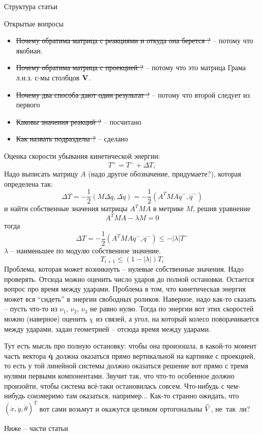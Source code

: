 



{\huge Структура статьи}


\vspace{20pt}

{\huge Открытые вопросы}
\begin{itemize}
    \item \sout{Почему обратима матрица с реакциями и откуда она берется ?} -- потому что якобиан.
    \item \sout{Почему обратима матрица с проекцией ?} -- потому что это матрица Грама л.н.з. с-мы столбцов $\mathbf{V}$.
    \item \sout{Почему два способа дают один результат ?} -- потому что второй следует из первого
    \item \sout{Каковы значения реакций ?} -- посчитано
    \item \sout{Как назвать подразделы ?} -- сделано
\end{itemize}

Оценка скорости убывания кинетической энергии:
$$
T^+ = T^- + \Delta T,
$$
Надо выписать матрицу $A$ (надо другое обозначение, придумаете?), которая определена так:
$$
\Delta T = -\frac12(M\Delta\dot{q},\Delta\dot{q}) = -\frac12(A^T M A\dot{q}^-, \dot{q}^{-})
$$
и найти собственные значения матрицы $A^T M A$ в метрике $M$, решив уравнение
$$
A^T M A - \lambda M = 0
$$
тогда 
$$
\Delta T = -\frac12(A^T M A\dot{q}^-, \dot{q}^{-}) \leq -|\lambda| T^{-}
$$
$\lambda$ -- наименьшее по модулю собственное значение.
$$
T_{i+1}\leq (1-|\lambda|) T_{i}
$$
Проблема, которая может возникнуть -- нулевые собственные значения. Надо проверять.
Отсюда можно оценить число ударов до полной остановки.
Остается вопрос про время между ударами.
Проблема в том, что кинетическая энергия может вся ``сидеть'' в энергии свободных роликов. Наверное, надо как-то сказать -- пусть что-то из $\nu_1$, $\nu_2$, $\nu_3$ не равно нулю. Тогда по энергии вот этих скоростей можно (наверное) оценить $\dot{\chi}$ из связей, а угол, на который колесо поворачивается между ударами, задан геометрией -- отсюда время между ударами.

Тут есть мысль про полную остановку: чтобы она произошла, в какой-то момент часть вектора $\dot{\mathbf{q}}$ должна оказаться прямо вертикальной на картинке с проекцией, то есть у той линейной системы должно оказаться решение вот прямо с тремя нулями первыми компонентами. Звучит так, что что-то особенное должно произойти, чтобы система всё-таки остановилась совсем. Что-нибудь с чем-нибудь соизмеримо там оказаться, например... Как-то странно ожидать, что $(\dot{x}, \dot{y}, \dot{\theta})^T$ вот сами возьмут и окажутся целиком ортогональны $\widetilde{V}$, не~так~ли?

\vspace{20pt}

{\huge Ниже -- части статьи}
\setcounter{section}{1}
\newpage

% 

















% 



